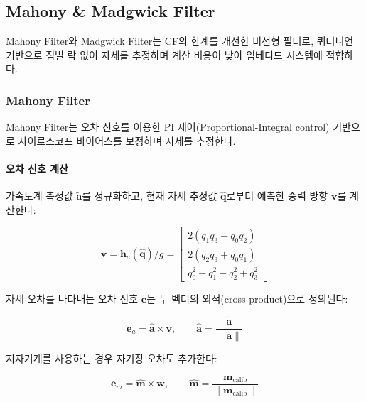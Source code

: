 \subsection{Mahony \& Madgwick Filter}

Mahony Filter와 Madgwick Filter는 CF의 한계를 개선한 비선형 필터로,
쿼터니언 기반으로 짐벌 락 없이 자세를 추정하며
계산 비용이 낮아 임베디드 시스템에 적합하다.

\subsubsection{Mahony Filter}

Mahony Filter는 오차 신호를 이용한 PI 제어(Proportional-Integral control) 기반으로
자이로스코프 바이어스를 보정하며 자세를 추정한다.

\paragraph{오차 신호 계산}

가속도계 측정값 $\tilde{\mathbf{a}}$를 정규화하고,
현재 자세 추정값 $\hat{\mathbf{q}}$로부터 예측한 중력 방향 $\mathbf{v}$를 계산한다:

\begin{equation}
    \mathbf{v} = \mathbf{h}_a(\hat{\mathbf{q}}) / g = \begin{bmatrix}
        2(q_1 q_3 - q_0 q_2) \\
        2(q_2 q_3 + q_0 q_1) \\
        q_0^2 - q_1^2 - q_2^2 + q_3^2
    \end{bmatrix}
    \label{eq:mahony_gravity}
\end{equation}

자세 오차를 나타내는 오차 신호 $\mathbf{e}$는 두 벡터의 외적(cross product)으로 정의된다:

\begin{equation}
    \mathbf{e}_a = \hat{\mathbf{a}} \times \mathbf{v}, \qquad \hat{\mathbf{a}} = \frac{\tilde{\mathbf{a}}}{\|\tilde{\mathbf{a}}\|}
    \label{eq:mahony_error}
\end{equation}

지자기계를 사용하는 경우 자기장 오차도 추가한다:

\begin{equation}
    \mathbf{e}_m = \hat{\mathbf{m}} \times \mathbf{w}, \qquad \hat{\mathbf{m}} = \frac{\mathbf{m}_{\text{calib}}}{\|\mathbf{m}_{\text{calib}}\|}
    \label{eq:mahony_mag_error}
\end{equation}

